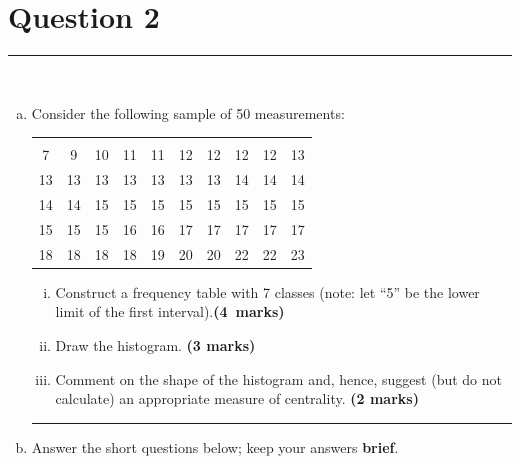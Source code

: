 \documentclass[12pt]{article}
\begin{document}
\section*{Question 2 }
\noindent\rule{\linewidth}{1pt}
\quad\\[-0.5cm]
\begin{enumerate}[a)]
\item Consider the following sample of 50 measurements:\\[-0.6cm]
    \begin{center}
    \begin{tabular}{|cccccccccc|}
    \hline
    &&&&&&&&&\\[-0.3cm]
    7 & 9 & 10 & 11 & 11 & 12 & 12 & 12 & 12 & 13 \\[0.1cm]
    13 & 13 & 13 & 13 & 13 & 13 & 13 & 14 & 14 & 14 \\[0.1cm]
    14 & 14 & 15 & 15 & 15 & 15 & 15 & 15 & 15 & 15 \\[0.1cm]
    15 & 15 & 15 & 16 & 16 & 17 & 17 & 17 & 17 & 17 \\[0.1cm]
    18 & 18 & 18 & 18 & 19 & 20 & 20 & 22 & 22 & 23 \\[0.1cm]
    \hline
    \end{tabular}
    \end{center}
    \begin{enumerate}[i)]\itemsep0.3cm
    \item Construct a frequency table with 7 classes (note: let ``5'' be the lower limit of the first interval).\hfill{\mbox{\scriptsize \bf (4 marks)}}
    \item Draw the histogram. \hfill{\scriptsize \bf (3 marks)}
    \item Comment on the shape of the histogram and, hence, suggest (but do not calculate) an appropriate measure of centrality. \hfill{\scriptsize \bf (2 marks)}
    \end{enumerate}
\begin{center}\noindent\rule{0.4\linewidth}{0.5pt}\end{center}
\item Answer the short questions below; keep your answers {\bf brief}.

\end{enumerate}
\end{document}
